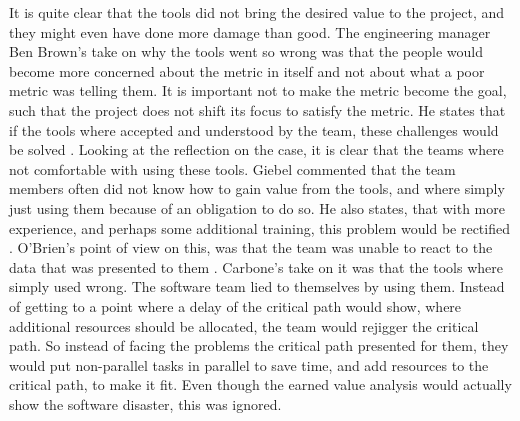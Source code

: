 It is quite clear that the tools did not bring the desired value to the project, and they might even have done more damage than good.
The engineering manager Ben Brown's take on why the tools went so wrong was that the people would become more concerned about the metric in itself and not about what a poor metric was telling them. It is important not to make the metric become the goal, such that the project does not shift its focus to satisfy the metric. He states that if the tools where accepted and understood by the team, these challenges would be solved \cite[p. 12]{GinoPisano2005}.
Looking at the reflection on the case, it is clear that the teams where not comfortable with using these tools. Giebel commented that the team members often did not know how to gain value from the tools, and where simply just using them because of an obligation to do so. He also states, that with more experience, and perhaps some additional training, this problem would be rectified \cite[p. 11]{GinoPisano2005}.
O'Brien's point of view on this, was that the team was unable to react to the data that was presented to them \cite[p. 11]{GinoPisano2005}.
Carbone's take on it was that the tools where simply used wrong. The software team lied to themselves by using them. Instead of getting to a point where a delay of the critical path would show, where additional resources should be allocated, the team would rejigger the critical path. So instead of facing the problems the critical path presented for them, they would put non-parallel tasks in parallel to save time, and add resources to the critical path, to make it fit. Even though the earned value analysis would actually show the software disaster, this was ignored. \cite[p. 11]{GinoPisano2005}

